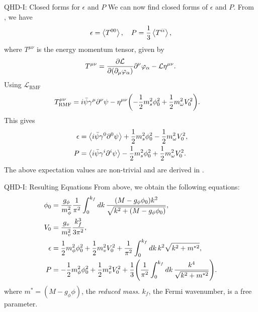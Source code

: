 \documentclass[handout]{beamer}
\newcommand{\Letter}[1]{\mathcal{#1}}
\newcommand{\Lag}{\Letter{L}}
\newcommand{\p}{\partial}
\begin{document}
    \begin{frame}{QHD-I: Closed forms for $\epsilon$ and $P$}
        We can now find closed forms of $\epsilon$ and $P$. From \autocite{diener_2008}, we have
        \[\epsilon = \expval{T^{00}}, \quad P = \frac{1}{3}\expval{T^{ii}},\]
        where $T^{\mu\nu}$ is the energy momentum tensor, given by
        \vspace{-5pt}
        \begin{align*}
            T^{\mu\nu} = \pdv{\Lag}{(\p_\mu \varphi_\alpha)}\p^\nu \varphi_\alpha - \Lag \eta^{\mu\nu}.
        \end{align*}
        \vspace{-5pt}
        Using $\Lag_\text{RMF}$
        \vspace{-5pt}
        \begin{align*}
            T^{\mu\nu}_\text{RMF} & =i\bar\psi\gamma^\mu \p^\nu \psi - \eta^{\mu\nu} \pqty{- \frac{1}{2} m_s^2 \phi_0^2 + \frac{1}{2} m_\omega^2 V_0^2}.
        \end{align*}
        \vspace{-5pt}
        This gives
        \vspace{-15pt}
        \begin{align*}
            \epsilon & = \expval{i\bar\psi\gamma^0 \p^0 \psi} + \frac{1}{2} m_s^2 \phi_0^2 - \frac{1}{2} m_\omega^2 V_0^2,\\
            P & = \expval{i\bar\psi\gamma^i \p^i \psi}  - \frac{1}{2} m_s^2 \phi_0^2 + \frac{1}{2} m_\omega^2 V_0^2.
        \end{align*}
        The above expectation values are non-trivial and are derived in \autocite{diener_2008}.
    \end{frame}

    \begin{frame}{QHD-I: Resulting Equations}
        From above, we obtain the following equations: \pause
        \begin{align*}
            \phi_0 &= \frac{g_\phi}{m_\phi^2} \frac{1}{\pi^2} \int_0^{k_f} \dd{k} \frac{(M-g_\phi \phi_0) k^2 }{\sqrt{k^2 + (M-g_\phi \phi_0)}},  \\
            V_0 &= \frac{g_v}{m_v^2} \frac{k_f^3}{3\pi^2}, \\
            \epsilon & = \frac{1}{2} m_\phi^2 \phi_0^2 + \frac{1}{2} m_v^2 V_0^2 + \frac{1}{\pi^2} \int_0^{k_f} \dd{k} k^2 \sqrt{k^2 + m^{*2}},\\
            P & = -\frac{1}{2} m_\phi^2 \phi_0^2 + \frac{1}{2} m_v^2 V_0^2 + \frac{1}{3} \pqty{\frac{1}{\pi^2} \int_0^{k_f} \dd{k}\frac{k^4}{\sqrt{k^2 + m^{*2}}}}.
        \end{align*}
        where $m^* = (M-g_\phi \phi)$, the \textit{reduced mass}. $k_f$, the Fermi wavenumber, is a free parameter. 
    \end{frame}
\end{document}

